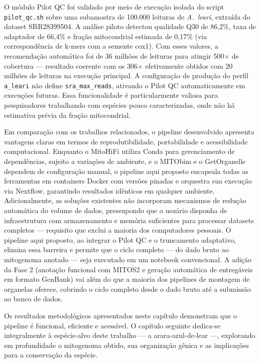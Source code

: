 O módulo Pilot QC foi validado por meio de execução isolada do script \texttt{pilot\_qc.sh} sobre uma subamostra de 100.000 leituras de \textit{A.~leari}, extraída do dataset SRR28399504. A análise piloto detectou qualidade Q30 de 86,2\%, taxa de adaptador de 66,4\% e fração mitocondrial estimada de 0,17\% (via correspondência de k-mers com a semente cox1). Com esses valores, a recomendação automática foi de 36 milhões de leituras para atingir 500$\times$ de cobertura --- resultado coerente com os 306$\times$ efetivamente obtidos com 20 milhões de leituras na execução principal. A configuração de produção do perfil \texttt{a\_leari} não define \texttt{sra\_max\_reads}, ativando o Pilot QC automaticamente em execuções futuras. Essa funcionalidade é particularmente valiosa para pesquisadores trabalhando com espécies pouco caracterizadas, onde não há estimativa prévia da fração mitocondrial.

Em comparação com os trabalhos relacionados, o pipeline desenvolvido apresenta vantagens claras em termos de reprodutibilidade, portabilidade e acessibilidade computacional. Enquanto o MitoHiFi \cite{ulianosilva2023} utiliza Conda para gerenciamento de dependências, sujeito a variações de ambiente, e o MITObim \cite{hahn2013} e o GetOrganelle \cite{jin2020} dependem de configuração manual, o pipeline aqui proposto encapsula todas as ferramentas em containers Docker com versões pinadas e orquestra sua execução via Nextflow, garantindo resultados idênticos em qualquer ambiente. Adicionalmente, as soluções existentes não incorporam mecanismos de redução automática do volume de dados, pressupondo que o usuário disponha de infraestrutura com armazenamento e memória suficientes para processar datasets completos --- requisito que exclui a maioria dos computadores pessoais. O pipeline aqui proposto, ao integrar o Pilot QC e o truncamento adaptativo, elimina essa barreira e permite que o ciclo completo --- do dado bruto ao mitogenoma anotado --- seja executado em um notebook convencional. A adição da Fase 2 (anotação funcional com MITOS2 e geração automática de entregáveis em formato GenBank) vai além do que a maioria dos pipelines de montagem de organelas oferece, cobrindo o ciclo completo desde o dado bruto até a submissão ao banco de dados.

Os resultados metodológicos apresentados neste capítulo demonstram que o pipeline é funcional, eficiente e acessível. O capítulo seguinte dedica-se integralmente à espécie-alvo deste trabalho --- a arara-azul-de-lear ---, explorando em profundidade o mitogenoma obtido, sua organização gênica e as implicações para a conservação da espécie.
